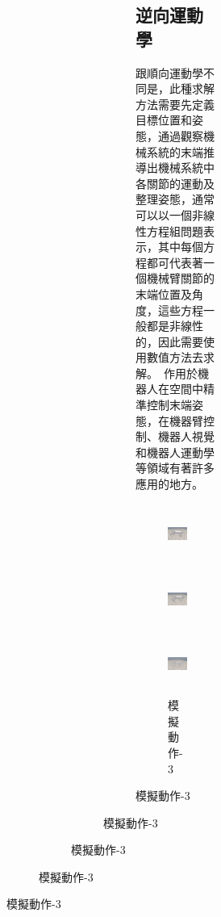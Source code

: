 \begin{figure}[htb!]
\begin{figure}[htb!]
\begin{figure}[htb!]
\begin{figure}[htb!]
\begin{figure}[htb!]
\subsection{逆向運動學}
跟順向運動學不同是，此種求解方法需要先定義目標位置和姿態，通過觀察機械系統的末端推導出機械系統中各關節的運動及整理姿態，通常可以以一個非線性方程組問題表示，其中每個方程都可代表著一個機械臂關節的末端位置及角度，這些方程一般都是非線性的，因此需要使用數值方法去求解。\
作用於機器人在空間中精準控制末端姿態，在機器臂控制、機器人視覺和機器人運動學等領域有著許多應用的地方。\\
\begin{figure}[htbp]
  \begin{minipage}[t]{0.3\linewidth}
    \centering
    \includegraphics[height=2cm,width=3cm]{模擬動作-1}
    \caption{模擬動作-1}
    \label{模擬動作-1}
  \end{minipage}
  \hfill
  \begin{minipage}[t]{0.3\linewidth}
    \centering
    \includegraphics[height=2cm,width=3cm]{模擬動作-2}
    \caption{模擬動作-2}
    \label{模擬動作-2}
  \end{minipage}
  \hfill
  \begin{minipage}[t]{0.3\linewidth}
    \centering
    \includegraphics[height=2cm,width=3cm]{模擬動作-3}
    \caption{模擬動作-3}
    \label{模擬動作-3}
  \end{minipage}
\end{figure}


\end{figure}
\end{figure}
\end{figure}
\end{figure}
\end{figure}
